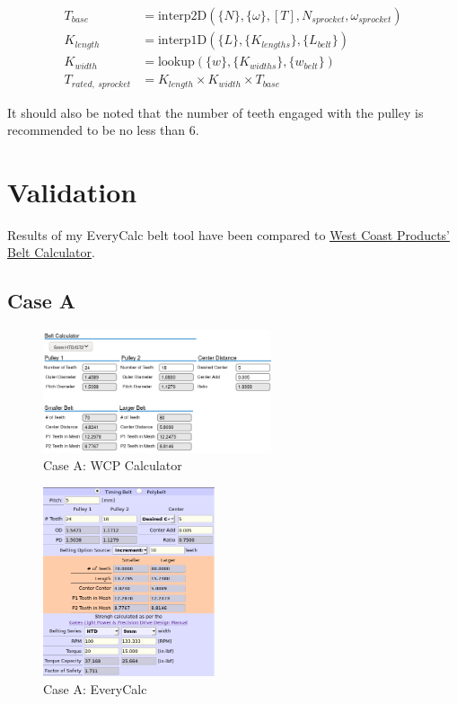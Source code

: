 \documentclass[10pt,letterpaper]{article}
\begin{document}
	\begin{align}
		T_{base} &= \text{interp2D}(\{N\}, \{\omega\}, [T], N_{sprocket}, \omega_{sprocket}) \\
		K_{length} &= \text{interp1D}(\{L\}, \{K_{lengths}\}, \{L_{belt}\}) \\
		K_{width} &= \text{lookup}(\{w\}, \{K_{widths}\}, \{w_{belt}\}) \\
		T_{rated,\ sprocket} &= K_{length} \times K_{width} \times T_{base}
	\end{align}

	It should also be noted that the number of teeth engaged with the pulley is recommended to be no less than 6.

	\newpage

	\section{Validation}

	Results of my EveryCalc belt tool have been compared to \href{https://www.wcproducts.com/how-to-belts/}{\underline{West Coast Products' Belt Calculator}}.

	\subsection*{Case A}

	\begin{figure}[H]
		\includegraphics[width=0.60\textwidth]{validation/belts_WCP_A.png}
		\caption{Case A: WCP Calculator}
	\end{figure}

	\begin{figure}[H]
		\includegraphics[width=0.45\textwidth]{validation/belts_EC_A.png}
		\caption{Case A: EveryCalc}
	\end{figure}
\end{document}

